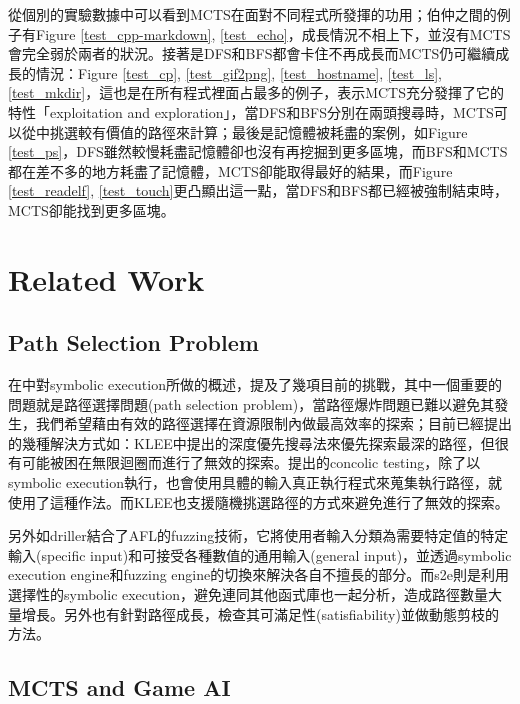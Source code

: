 \documentclass[12pt,a4paper,oneside]{book}
\begin{document}
\newpage

從個別的實驗數據中可以看到MCTS在面對不同程式所發揮的功用；伯仲之間的例子有Figure \ref{test_cpp-markdown}, \ref{test_echo}，成長情況不相上下，並沒有MCTS會完全弱於兩者的狀況。接著是DFS和BFS都會卡住不再成長而MCTS仍可繼續成長的情況：Figure \ref{test_cp}, \ref{test_gif2png}, \ref{test_hostname}, \ref{test_ls}, \ref{test_mkdir}，這也是在所有程式裡面占最多的例子，表示MCTS充分發揮了它的特性「exploitation and exploration」，當DFS和BFS分別在兩頭搜尋時，MCTS可以從中挑選較有價值的路徑來計算；最後是記憶體被耗盡的案例，如Figure \ref{test_ps}，DFS雖然較慢耗盡記憶體卻也沒有再挖掘到更多區塊，而BFS和MCTS都在差不多的地方耗盡了記憶體，MCTS卻能取得最好的結果，而Figure \ref{test_readelf}, \ref{test_touch}更凸顯出這一點，當DFS和BFS都已經被強制結束時，MCTS卻能找到更多區塊。

\chapter{Related Work}

\section{Path Selection Problem}

在\cite{sharma2012critical}\cite{schwartz2010all}中對symbolic execution所做的概述，提及了幾項目前的挑戰，其中一個重要的問題就是路徑選擇問題(path selection problem)，當路徑爆炸問題已難以避免其發生，我們希望藉由有效的路徑選擇在資源限制內做最高效率的探索；目前已經提出的幾種解決方式如：KLEE\cite{cadar2008klee}中提出的深度優先搜尋法來優先探索最深的路徑，但很有可能被困在無限迴圈而進行了無效的探索。\cite{sen2007concolic}提出的concolic testing，除了以symbolic execution執行，也會使用具體的輸入真正執行程式來蒐集執行路徑，\cite{sen2005cute}就使用了這種作法。而KLEE\cite{cadar2008klee}也支援隨機挑選路徑的方式來避免進行了無效的探索。

另外如driller\cite{stephens2016driller}結合了AFL\cite{AFL}的fuzzing技術，它將使用者輸入分類為需要特定值的特定輸入(specific input)和可接受各種數值的通用輸入(general input)，並透過symbolic execution engine和fuzzing engine的切換來解決各自不擅長的部分。而s2e\cite{chipounov2012s2e}則是利用選擇性的symbolic execution，避免連同其他函式庫也一起分析，造成路徑數量大量增長。另外也有針對路徑成長，檢查其可滿足性(satisfiability)並做動態剪枝的方法\cite{PathPruning}。

\section{MCTS and Game AI}
\end{document}
